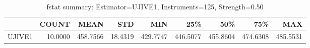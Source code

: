 \begin{table}[ht]
\centering
\caption{fstat summary: Estimator=UJIVE1, Instruments=125, Strength=0.50}
\begin{tabular}{lrrrrrrrr}
\toprule
 & COUNT & MEAN & STD & MIN & 25\% & 50\% & 75\% & MAX \\
\midrule
UJIVE1 & 10.0000 & 458.7566 & 18.4319 & 429.7747 & 446.5077 & 455.8604 & 474.6308 & 485.5531 \\
\bottomrule
\end{tabular}
\end{table}
